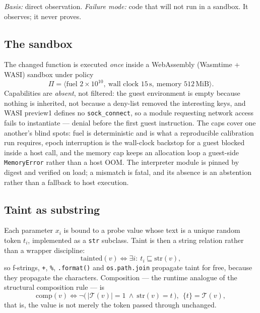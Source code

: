 \documentclass[conference]{IEEEtran}
\begin{document}
\emph{Basis:} direct observation. \emph{Failure mode:} code that will not run in a sandbox.
It observes; it never proves.

\subsection{The sandbox}
The changed function is executed \emph{once} inside a WebAssembly (Wasmtime + WASI) sandbox
under policy
\[
\Pi = \bigl\langle \text{fuel } 2{\times}10^{10},\ \text{wall clock } 15\,\mathrm{s},\ \text{memory } 512\,\mathrm{MiB} \bigr\rangle .
\]
Capabilities are \emph{absent}, not filtered: the guest environment is empty because nothing
is inherited, not because a deny-list removed the interesting keys, and WASI preview1 defines
no \texttt{sock\_connect}, so a module requesting network access fails to instantiate ---
denial before the first guest instruction. The caps cover one another's blind spots: fuel is
deterministic and is what a reproducible calibration run requires, epoch interruption is the
wall-clock backstop for a guest blocked inside a host call, and the memory cap keeps an
allocation loop a guest-side \texttt{MemoryError} rather than a host OOM. The interpreter
module is pinned by digest and verified on load; a mismatch is fatal, and its absence is an
abstention rather than a fallback to host execution.

\subsection{Taint as substring}
Each parameter $x_i$ is bound to a probe value whose text is a unique random token $t_i$,
implemented as a \texttt{str} subclass. Taint is then a string relation rather than a wrapper
discipline:
\begin{equation}
\mathrm{tainted}(v) \iff \exists i:\ t_i \sqsubseteq \mathrm{str}(v),
\end{equation}
so f-strings, \texttt{+}, \texttt{\%}, \texttt{.format()} and \texttt{os.path.join}
propagate taint for free, because they propagate the characters. Composition --- the runtime
analogue of the structural composition rule --- is
\begin{equation}
\mathrm{comp}(v) \iff \neg\bigl(\,|\mathcal{T}(v)|=1 \ \wedge\ \mathrm{str}(v)=t\,\bigr),\ \ \{t\}=\mathcal{T}(v),
\end{equation}
that is, the value is not merely the token passed through unchanged.
\end{document}

